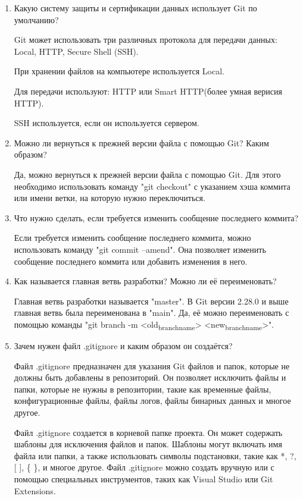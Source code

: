 \documentclass[a4paper,14pt]{extarticle}
\begin{document}
\begin{enumerate}
\item Какую систему защиты и сертификации данных использует Git по умолчанию?

Git может использовать три различных протокола для передачи данных:
Local, HTTP, Secure Shell (SSH).

При хранении файлов на компьютере используется Local.

Для передачи используют: HTTP или Smart HTTP(более умная верисия HTTP).

SSH используется, если он используется сервером.

\item Можно ли вернуться к прежней версии файла с помощью Git? Каким образом? 

Да, можно вернуться к прежней версии файла с помощью Git.
Для этого необходимо использовать команду "git checkout"
с указанием хэша коммита или имени ветки, на которую нужно переключиться.

\item Что нужно сделать, если требуется изменить сообщение последнего коммита?

Если требуется изменить сообщение последнего коммита,
можно использовать команду "git commit --amend".
Она позволяет изменить сообщение последнего коммита
или добавить изменения в него.

\item Как называется главная ветвь разработки? Можно ли её переименовать?

Главная ветвь разработки называется "master". В Git версии 2.28.0 и выше главная ветвь была переименована в "main".
Да, её можно переименовать с помощью команды "git branch -m <old\textsubscript{branch}\textsubscript{name}> <new\textsubscript{branch}\textsubscript{name}>".

\item Зачем нужен файл .gitignore и каким образом он создаётся?

Файл .gitignore предназначен для указания Git файлов и папок,
которые не должны быть добавлены в репозиторий.
Он позволяет исключить файлы и папки, которые не нужны в репозитории,
такие как временные файлы, конфигурационные файлы,
файлы логов, файлы бинарных данных и многое другое.

Файл .gitignore создается в корневой папке проекта.
Он может содержать шаблоны для исключения файлов и папок.
Шаблоны могут включать имя файла или папки, а также использовать
символы подстановки, такие как *, ?, [ ], \{ \}, и многое другое.
Файл .gitignore можно создать вручную или с помощью специальных инструментов,
таких как Visual Studio или Git Extensions.
\end{enumerate}
\end{document}
